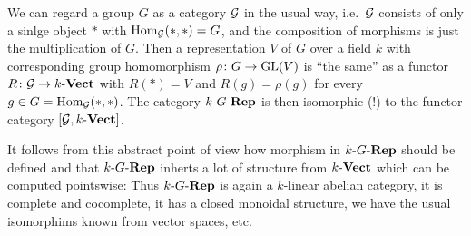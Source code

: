 \begin{remark}
  We can regard a group $G$ as a category $\mathcal{G}$ in the usual way, i.e.\ $\mathcal{G}$ consists of only a sinlge object $\ast$ with $\operatorname{Hom}_{\mathcal{G}}(\ast, \ast) = G$, and the composition of morphisms is just the multiplication of $G$.
  Then a representation $V$ of $G$ over a field $k$ with corresponding group homomorphism $\rho \colon G \to \operatorname{GL}(V)$ is \enquote{the same} as a functor $R \colon \mathcal{G} \to k\text{-}\mathbf{Vect}$ with $R(\ast) = V$ and $R(g) = \rho(g)$ for every $g \in G = \operatorname{Hom}_{\mathcal{G}}(\ast, \ast)$.
  The category $k\text{-}G\text{-}\mathbf{Rep}$ is then isomorphic (!) to the functor category $[\mathcal{G}, k\text{-}\mathbf{Vect}]$.
  
  It follows from this abstract point of view how morphism in $k\text{-}G\text{-}\mathbf{Rep}$ should be defined and that $k\text{-}G\text{-}\mathbf{Rep}$ inherts a lot of structure from $k\text{-}\mathbf{Vect}$ which can be computed pointswise:
  Thus $k\text{-}G\text{-}\mathbf{Rep}$ is again a $k$-linear abelian category, it is complete and cocomplete, it has a closed monoidal structure, we have the usual isomorphims known from vector spaces, etc.
\end{remark}
